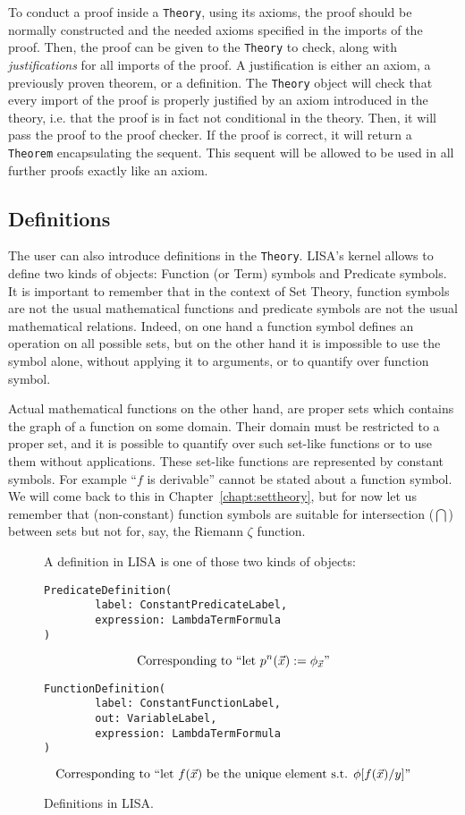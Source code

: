 To conduct a proof inside a \lstinline{Theory}{}, using its axioms, the proof should be normally constructed and the needed axioms specified in the imports of the proof. Then, the proof can be given to the \lstinline{Theory}{} to check, along with \textit{justifications} for all imports of the proof. A justification is either an axiom, a previously proven theorem, or a definition. The \lstinline{Theory}{} object will check that every import of the proof is properly justified by an axiom introduced in the theory, i.e. that the proof is in fact not conditional in the theory. Then, it will pass the proof to the proof checker. If the proof is correct, it will return a \lstinline{Theorem}{} encapsulating the sequent. This sequent will be allowed to be used in all further proofs exactly like an axiom.


\subsection{Definitions}
\label{subs:definitions}
The user can also introduce definitions in the \lstinline{Theory}{}.
LISA's kernel allows to define two kinds of objects: Function (or Term) symbols and Predicate symbols. It is important to remember that in the context of Set Theory, function symbols are not the usual mathematical functions and predicate symbols are not the usual mathematical relations. Indeed, on one hand a function symbol defines an operation on all possible sets, but on the other hand it is impossible to use the symbol alone, without applying it to arguments, or to quantify over function symbol.

Actual mathematical functions on the other hand, are proper sets which contains the graph of a function on some domain. Their domain must be restricted to a proper set, and it is possible to quantify over such set-like functions or to use them without applications. These set-like functions are represented by constant symbols.  For example ``$f$ is derivable'' cannot be stated about a function symbol. We will come back to this in Chapter~\ref{chapt:settheory}, but for now let us remember that (non-constant) function symbols are suitable for intersection ($\bigcap$) between sets but not for, say, the Riemann $\zeta$ function.


\begin{figure}
  A definition in LISA is one of those two kinds of objects:
  \begin{lstlisting}[frame=single]
PredicateDefinition(
		label: ConstantPredicateLabel,
		expression: LambdaTermFormula
)
\end{lstlisting}
  $$
    \textnormal{Corresponding to ``let } p^n(\vec{x}) := \phi_{\vec{x}}\textnormal{''}
  $$
  \begin{lstlisting}[frame=single]
FunctionDefinition(
		label: ConstantFunctionLabel,
		out: VariableLabel, 
		expression: LambdaTermFormula
)
\end{lstlisting}
  $$
    \textnormal{Corresponding to ``let } f(\vec{x}) \textnormal{ be the unique element s.t. } \phi[f(\vec{x})/y]\textnormal{''}
  $$
  \caption{Definitions in LISA.}
  \label{fig:definitions}
\end{figure}

